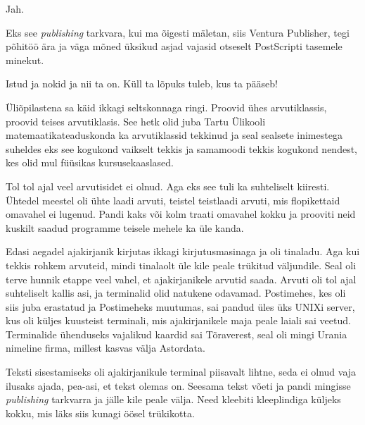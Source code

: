 Jah.


Eks see  \emph{publishing} tarkvara, kui ma õigesti mäletan, siis Ventura Publisher, tegi põhitöö ära ja väga mõned üksikud asjad vajasid otseselt PostScripti tasemele minekut. 


Istud ja nokid ja nii ta on. Küll ta lõpuks tuleb, kus ta pääseb!


Üliõpilastena sa käid ikkagi seltskonnaga ringi. Proovid ühes arvutiklassis, proovid teises arvutiklasis. See hetk olid juba Tartu Ülikooli matemaatikateaduskonda ka arvutiklassid tekkinud ja seal sealsete inimestega suheldes eks see  kogukond vaikselt tekkis ja samamoodi tekkis kogukond nendest, kes olid mul füüsikas kursusekaaslased.


Tol tol ajal veel arvutisidet ei olnud. Aga eks see tuli ka suhteliselt kiiresti. Ühtedel meestel  oli ühte laadi arvuti, teistel teistlaadi arvuti, mis flopikettaid omavahel ei lugenud. Pandi kaks või kolm traati omavahel kokku ja prooviti neid kuskilt saadud programme teisele mehele ka üle kanda.


Edasi aegadel ajakirjanik kirjutas ikkagi kirjutusmasinaga ja oli tinaladu. Aga kui tekkis rohkem arvuteid,  mindi tinalaolt üle kile peale trükitud väljundile. Seal oli terve hunnik etappe veel vahel, et ajakirjanikele arvutid saada. Arvuti oli tol ajal suhteliselt kallis asi, ja terminalid olid natukene odavamad. Postimehes, kes oli siis juba erastatud ja Postimeheks muutumas, sai pandud üles üks UNIXi server, kus oli küljes kuusteist terminali, mis ajakirjanikele maja peale laiali sai veetud. Terminalide ühenduseks vajalikud kaardid sai Tõraverest, seal oli mingi Urania nimeline firma, millest kasvas välja Astordata.

Teksti sisestamiseks oli ajakirjanikule terminal piisavalt lihtne, seda ei olnud vaja ilusaks ajada, pea-asi, et tekst olemas on. Seesama tekst võeti ja pandi mingisse \emph{publishing} tarkvarra ja jälle kile peale välja. Need kleebiti kleeplindiga küljeks kokku, mis läks siis kunagi öösel trükikotta. 

